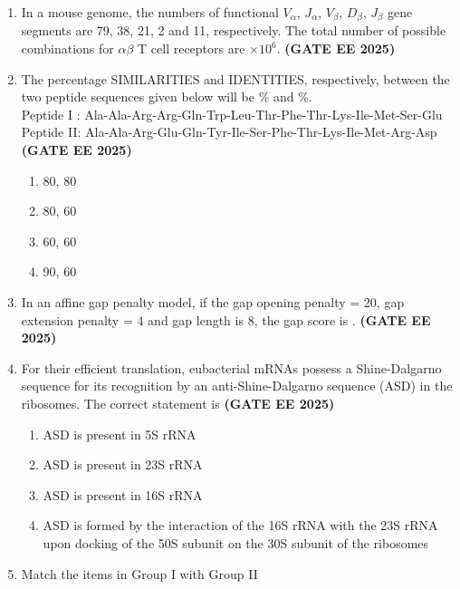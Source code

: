 \documentclass[journal,12pt,onecolumn]{IEEEtran}
\theoremstyle{remark}
\begin{document}
\begin{enumerate}
\item In a mouse genome, the numbers of functional $V_\alpha$, $J_\alpha$, $V_\beta$, $D_\beta$, $J_\beta$ gene segments are 79, 38, 21, 2 and 11, respectively. The total number of possible combinations for $\alpha\beta$ T cell receptors are \underline{\hspace{2cm}} $\times 10^6$. \hfill \textbf{(GATE EE 2025)}



\item The percentage SIMILARITIES and IDENTITIES, respectively, between the two peptide sequences given below will be \underline{\hspace{1cm}} \% and \underline{\hspace{1cm}} \%.
\\
Peptide I : Ala-Ala-Arg-Arg-Gln-Trp-Leu-Thr-Phe-Thr-Lys-Ile-Met-Ser-Glu \\
Peptide II: Ala-Ala-Arg-Glu-Gln-Tyr-Ile-Ser-Phe-Thr-Lys-Ile-Met-Arg-Asp\\
\hfill \textbf{(GATE EE 2025)}
\begin{enumerate} 
\item  80, 80
\item  80, 60
\item  60, 60
\item  90, 60
\end{enumerate}

\item In an affine gap penalty model, if the gap opening penalty = 20, gap extension penalty = 4 and gap length is 8, the gap score is \underline{\hspace{2cm}}.
\hfill \textbf{(GATE EE 2025)}
\item For their efficient translation, eubacterial mRNAs possess a Shine-Dalgarno sequence for its recognition by an anti-Shine-Dalgarno sequence (ASD) in the ribosomes. The correct statement is \hfill \textbf{(GATE EE 2025)}
\begin{enumerate} 
\item ASD is present in 5S rRNA
\item ASD is present in 23S rRNA
\item ASD is present in 16S rRNA
\item ASD is formed by the interaction of the 16S rRNA with the 23S rRNA upon docking of the 50S subunit on the 30S subunit of the ribosomes
\end{enumerate}

\item Match the items in Group I with Group II\\
\begin{tabular}{c c}


\end{tabular}
\end{enumerate}
\end{document}
